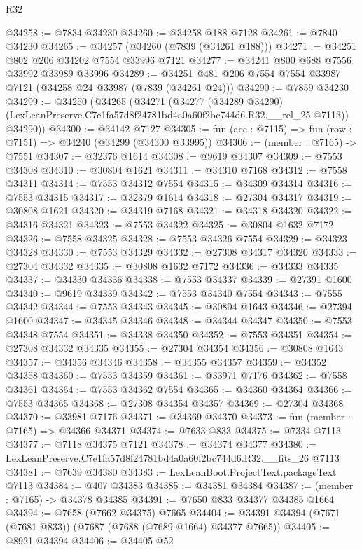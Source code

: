 \begin{lexlean}{R32}
\begin{coremodule}
@34258 := @7834 @34230
@34260 := @34258 @188 @7128
@34261 := @7840 @34230
@34265 := @34257 (@34260 (@7839 (@34261 @188)))
@34271 := @34251 @802 @206 @34202 @7554 @33996 @7121
@34277 := @34241 @800 @688 @7556 @33992 @33989 @33996
@34289 := @34251 @481 @206 @7554 @7554 @33987 @7121 (@34258 @24 @33987 (@7839 (@34261 @24)))
@34290 := @7859 @34230
@34299 := @34250
    (@34265
      (@34271
        (@34277
          (@34289 @34290)
          (LexLeanPreserve.C7e1fa57d8f24781bd4a0a60f2bc744d6.R32.__rel_25 @7113))
        @34290))
@34300 := @34142 @7127
@34305 := fun (acc : @7115) => fun (row : @7151) => @34240 (@34299 (@34300 @33995))
@34306 := (member : @7165) -> @7551
@34307 := @32376 @1614
@34308 := @9619 @34307
@34309 := @7553 @34308
@34310 := @30804 @1621
@34311 := @34310 @7168
@34312 := @7558 @34311
@34314 := @7553 @34312 @7554
@34315 := @34309 @34314
@34316 := @7553 @34315
@34317 := @32379 @1614
@34318 := @27304 @34317
@34319 := @30808 @1621
@34320 := @34319 @7168
@34321 := @34318 @34320
@34322 := @34316 @34321
@34323 := @7553 @34322
@34325 := @30804 @1632 @7172
@34326 := @7558 @34325
@34328 := @7553 @34326 @7554
@34329 := @34323 @34328
@34330 := @7553 @34329
@34332 := @27308 @34317 @34320
@34333 := @27304 @34332
@34335 := @30808 @1632 @7172
@34336 := @34333 @34335
@34337 := @34330 @34336
@34338 := @7553 @34337
@34339 := @27391 @1600
@34340 := @9619 @34339
@34342 := @7553 @34340 @7554
@34343 := @7555 @34342
@34344 := @7553 @34343
@34345 := @30804 @1643
@34346 := @27394 @1600
@34347 := @34345 @34346
@34348 := @34344 @34347
@34350 := @7553 @34348 @7554
@34351 := @34338 @34350
@34352 := @7553 @34351
@34354 := @27308 @34332 @34335
@34355 := @27304 @34354
@34356 := @30808 @1643
@34357 := @34356 @34346
@34358 := @34355 @34357
@34359 := @34352 @34358
@34360 := @7553 @34359
@34361 := @33971 @7176
@34362 := @7558 @34361
@34364 := @7553 @34362 @7554
@34365 := @34360 @34364
@34366 := @7553 @34365
@34368 := @27308 @34354 @34357
@34369 := @27304 @34368
@34370 := @33981 @7176
@34371 := @34369 @34370
@34373 := fun (member : @7165) => @34366 @34371
@34374 := @7633 @833
@34375 := @7334 @7113
@34377 := @7118 @34375 @7121
@34378 := @34374 @34377
@34380 := LexLeanPreserve.C7e1fa57d8f24781bd4a0a60f2bc744d6.R32.__fits_26 @7113
@34381 := @7639 @34380
@34383 := LexLeanBoot.ProjectText.packageText @7113
@34384 := @407 @34383
@34385 := @34381 @34384
@34387 := (member : @7165) -> @34378 @34385
@34391 := @7650 @833 @34377 @34385 @1664
@34394 := @7658 (@7662 @34375) @7665
@34404 := @34391 @34394 (@7671 (@7681 @833)) (@7687 (@7688 (@7689 @1664) @34377 @7665))
@34405 := @8921 @34394
@34406 := @34405 @52

\end{coremodule}
\end{lexlean}
